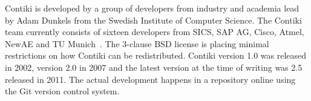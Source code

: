 Contiki is developed by a group of developers from industry and academia
lead by Adam Dunkels from the Swedish Institute of Computer Science.
The Contiki team currently consists of sixteen developers from SICS,
SAP AG, Cisco, Atmel, NewAE and TU Munich~\cite{contiki-docs}.
The 3-clause BSD license is placing minimal restrictions on how Contiki can be redistributed.
Contiki version 1.0 was released in 2002, version 2.0 in 2007 and the latest version at the time of writing was 2.5
released in 2011. The actual development happens in a repository online using the Git version control system.









